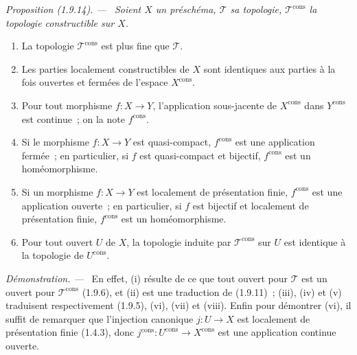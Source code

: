 \documentclass[10pt,oneside]{book}
\makeatletter
\newcommand{\setmanualcurrentlabel}[1]{\def\@currentlabel{#1}}
\newenvironment{proposition}[1][]{%
  \setmanualcurrentlabel{#1}\par\medskip\noindent\itshape Proposition (#1). ---\ }{\par}
\newenvironment{proof}{%
  \par\medskip\noindent\textit{Démonstration. ---\ }}{\par}
\makeatother
\begin{document}
\begin{proposition}[1.9.14]
\label{IV.1.9.14-fr}
Soient $X$ un préschéma, $\mathscr T$ sa topologie,
$\mathscr T^{\mathrm{cons}}$ la topologie constructible sur $X$.
\begin{enumerate}
  \item[(i)] La topologie $\mathscr T^{\mathrm{cons}}$ est plus fine que
  $\mathscr T$.
  \item[(ii)] Les parties localement constructibles de $X$ sont identiques
  aux parties à la fois ouvertes et fermées de l'espace $X^{\mathrm{cons}}$.
  \item[(iii)] Pour tout morphisme $f:X\to Y$, l'application sous-jacente de
  $X^{\mathrm{cons}}$ dans $Y^{\mathrm{cons}}$ est continue~; on la note
  $f^{\mathrm{cons}}$.
  \item[(iv)] Si le morphisme $f:X\to Y$ est quasi-compact,
  $f^{\mathrm{cons}}$ est une application fermée~; en particulier, si $f$
  est quasi-compact et bijectif, $f^{\mathrm{cons}}$ est un homéomorphisme.
  \item[(v)] Si un morphisme $f:X\to Y$ est localement de présentation
  finie, $f^{\mathrm{cons}}$ est une application ouverte~; en particulier,
  si $f$ est bijectif et localement de présentation finie,
  $f^{\mathrm{cons}}$ est un homéomorphisme.
  \item[(vi)] Pour tout ouvert $U$ de $X$, la topologie induite par
  $\mathscr T^{\mathrm{cons}}$ sur $U$ est identique à la topologie de
  $U^{\mathrm{cons}}$.
\end{enumerate}
\end{proposition}

\begin{proof}
En effet, (i) résulte de ce que tout ouvert pour $\mathscr T$ est un ouvert
pour $\mathscr T^{\mathrm{cons}}$ (1.9.6), et (ii) est une traduction de
(1.9.11)~; (iii), (iv) et (v) traduisent respectivement (1.9.5), (vi), (vii)
et (viii). Enfin pour démontrer (vi), il suffit de remarquer que l'injection
canonique $j:U\to X$ est localement de présentation finie (1.4.3), donc
$j^{\mathrm{cons}}:U^{\mathrm{cons}}\to X^{\mathrm{cons}}$ est une
application continue ouverte.
\end{proof}
\end{document}
